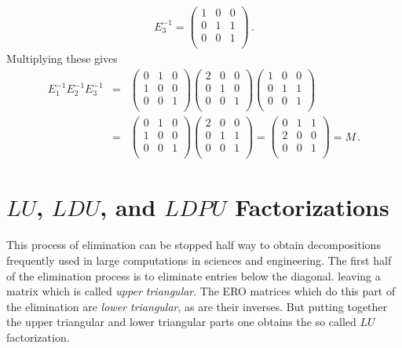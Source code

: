 \begin{example}
\begin{eqnarray*}
E_3^{-1}
= \left(\begin{array}{ccc}
1  &0 &0\\
0  &1 & 1\\ 
0  &0 &1\\
\end{array}  \right) \,.
\end{eqnarray*}
Multiplying these gives 
\begin{eqnarray*}
E_1^{-1}E_2^{-1}E_3^{-1}
&=& 
\left(\begin{array}{ccc}
0  &1 &0\\
1  &0 &0\\ 
0  &0 &1\\
\end{array}  \right)
 \left(\begin{array}{ccc}
2  &0 &0\\
0  &1 &0\\ 
0  &0 &1\\
\end{array}  \right) 
\left(\begin{array}{ccc}
1  &0 &0\\
0  &1 & 1\\ 
0  &0 &1\\
\end{array}  \right) 
\\ %
&=&
\left(\begin{array}{ccc}
0  &1 &0\\
1  &0 &0\\ 
0  &0 &1\\
\end{array}  \right)
 \left(\begin{array}{ccc}
2  &0 &0\\
0  &1 &1\\ 
0  &0 &1\\
\end{array}  \right) 
= %
\left(\begin{array}{ccc}
 0 &1 &1\\
2  &0 &0\\ 
0  &0 &1\\
\end{array}  \right)  = M \, .
\end{eqnarray*}
\end{example}

\section{$LU$, $LDU$, and $LDPU$ Factorizations}
This process of elimination can be stopped half way to obtain decompositions frequently used in large computations in sciences and engineering. 
The first half of the elimination process is to eliminate entries below the diagonal. 
leaving a matrix which is called {\itshape upper triangular}. The ERO matrices which do this part of the elimination are {\itshape lower triangular}, as are their inverses. But putting together the upper triangular and lower triangular parts one obtains the so called $LU$ factorization.

